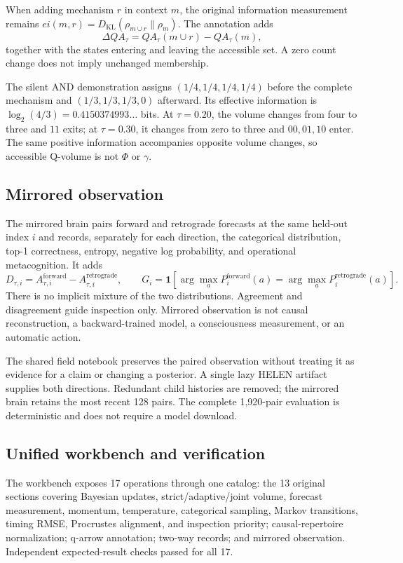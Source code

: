 \documentclass[11pt,a4paper]{article}
\begin{document}
When adding mechanism $r$ in context $m$, the original information measurement remains $ei(m,r)=D_{\mathrm{KL}}(\rho_{m\cup r}\|\rho_m)$. The annotation adds
\begin{equation}
\Delta QA_\tau=QA_\tau(m\cup r)-QA_\tau(m),
\end{equation}
together with the states entering and leaving the accessible set. A zero count change does not imply unchanged membership.

The silent AND demonstration assigns $(1/4,1/4,1/4,1/4)$ before the complete mechanism and $(1/3,1/3,1/3,0)$ afterward. Its effective information is $\log_2(4/3)=0.4150374993\ldots$ bits. At $\tau=0.20$, the volume changes from four to three and $11$ exits; at $\tau=0.30$, it changes from zero to three and $00,01,10$ enter. The same positive information accompanies opposite volume changes, so accessible Q-volume is not $\Phi$ or $\gamma$.

\subsection{Mirrored observation}
The mirrored brain pairs forward and retrograde forecasts at the same held-out index $i$ and records, separately for each direction, the categorical distribution, top-1 correctness, entropy, negative log probability, and operational metacognition. It adds
\begin{equation}
D_{\tau,i}=A_{\tau,i}^{\mathrm{forward}}-A_{\tau,i}^{\mathrm{retrograde}},\qquad
G_i=\mathbf 1[\arg\max_a P^{\mathrm{forward}}_i(a)=\arg\max_a P^{\mathrm{retrograde}}_i(a)].
\end{equation}
There is no implicit mixture of the two distributions. Agreement and disagreement guide inspection only. Mirrored observation is not causal reconstruction, a backward-trained model, a consciousness measurement, or an automatic action.

The shared field notebook preserves the paired observation without treating it as evidence for a claim or changing a posterior. A single lazy HELEN artifact supplies both directions. Redundant child histories are removed; the mirrored brain retains the most recent 128 pairs. The complete 1,920-pair evaluation is deterministic and does not require a model download.

\subsection{Unified workbench and verification}
The workbench exposes 17 operations through one catalog: the 13 original sections covering Bayesian updates, strict/adaptive/joint volume, forecast measurement, momentum, temperature, categorical sampling, Markov transitions, timing RMSE, Procrustes alignment, and inspection priority; causal-repertoire normalization; q-arrow annotation; two-way records; and mirrored observation. Independent expected-result checks passed for all 17.
\end{document}

